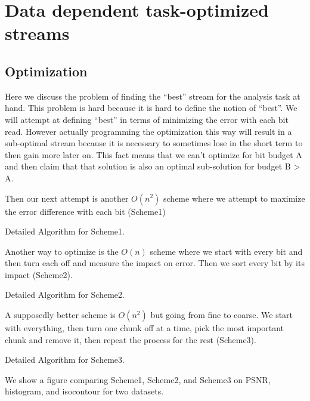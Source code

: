 \section{Data dependent task-optimized streams}


\subsection{Optimization}
Here we discuss the problem of finding the ``best'' stream for the analysis task at hand. This problem is hard because it is hard to define the notion of ``best''. We will attempt at defining ``best'' in terms of minimizing the error with each bit read. However actually programming the optimization this way will result in a sub-optimal stream because it is necessary to sometimes lose in the short term to then gain more later on. This fact means that we can't optimize for bit budget A and then claim that that solution is also an optimal sub-solution for budget B > A.

Then our next attempt is another $O(n^2)$ scheme where we attempt to maximize the error difference with each bit (Scheme1)

Detailed Algorithm for Scheme1.

Another way to optimize is the $O(n)$ scheme where we start with every bit and then turn each off and measure the impact on error. Then we sort every bit by its impact (Scheme2).

Detailed Algorithm for Scheme2.

A supposedly better scheme is $O(n^2)$ but going from fine to coarse. We start with everything, then turn one chunk off at a time, pick the most important chunk and remove it, then repeat the process for the rest (Scheme3).

Detailed Algorithm for Scheme3.

We show a figure comparing Scheme1, Scheme2, and Scheme3 on PSNR, histogram, and isocontour for two datasets.
